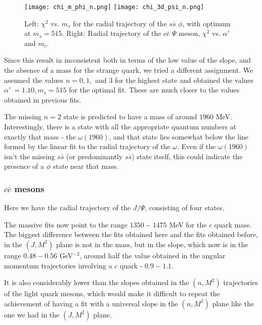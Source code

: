 \documentclass[11pt,a4]{article}
\newcommand{\alp}{\ensuremath{\alpha'\:}}
\newcommand{\ssb}{s\bar{s}}
\newcommand{\ccb}{c\bar{c}}
\begin{document}
		\begin{figure}[t!] \centering
						\texttt{[image: chi\_m\_phi\_n.png]}	 \hfill
						\texttt{[image: chi\_3d\_psi\_n.png]}
						\caption{\label{fig:chi_n_sc} Left: \(\chi^2\) vs. \(m_s\) for the radial trajectory of the \(\ssb\) \(\phi\), with optimum at \(m_s = 515\). Right: Radial trajectory of the \(\ccb\) \(\Psi\) meson, \(\chi^2\) vs. \(\alp\) and \(m_c\).}
				\end{figure}
		
		Since this result in inconsistent both in terms of the low value of the slope, and the absence of a mass for the strange quark, we tried a different assignment. We assumed the values \(n = 0,1,\) and \(3\) for the highest state and obtained the values \(\alp = 1.10, m_s = 515\) for the optimal fit. These are much closer to the values obtained in previous fits.
		
		The missing \(n = 2\) state is predicted to have a mass of around \(1960\) MeV. Interestingly, there is a state with all the appropriate quantum numbers at exactly that mass - the \(\omega(1960)\), and that state lies somewhat below the line formed by the linear fit to the radial trajectory of the \(\omega\). Even if the \(\omega(1960)\) isn't the missing \(\ssb\) (or predominantly \(\ssb\)) state itself, this could indicate the presence of a \(\phi\) state near that mass.
		
	\subsubsection{\texorpdfstring{$\ccb$}{c-cbar} mesons}
		Here we have the radial trajectory of the \(J/\Psi\), consisting of four states.
		
		The massive fits now point to the range \(1350-1475\) MeV for the \(c\) quark mass.	The biggest difference between the fits obtained here and the fits obtained before, in the \((J,M^2)\) plane is not in the mass, but in the slope, which now is in the range \(0.48-0.56\) GeV\(^{-2}\), around half the value obtained in the angular momentum trajectories involving a \(c\) quark - \(0.9-1.1\).
		
		It is also considerably lower than the slopes obtained in the \((n,M^2)\) trajectories of the light quark mesons, which would make it difficult to repeat the achievement of having a fit with a universal slope in the \((n,M^2)\) plane like the one we had in the \((J,M^2)\) plane.
	
\end{document}
